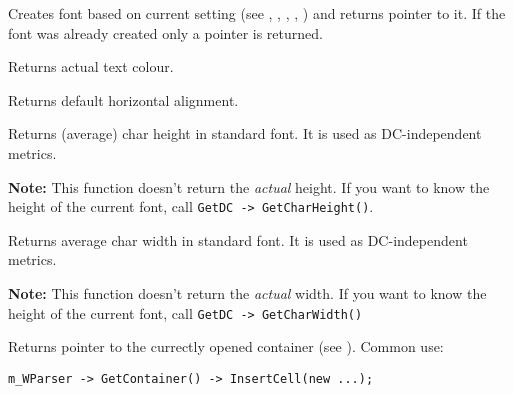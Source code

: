 
Creates font based on current setting (see 
, 
, 
, 
, 
)
and returns pointer to it.
If the font was already created only a pointer is returned.


\label{wxhtmlwinparsergetactualcolor}


Returns actual text colour.

\label{wxhtmlwinparsergetalign}


Returns default horizontal alignment.

\label{wxhtmlwinparsergetcharheight}


Returns (average) char height in standard font. It is used as DC-independent metrics.

{\bf Note:} This function doesn't return the {\it actual} height. If you want to
know the height of the current font, call {\tt GetDC -> GetCharHeight()}.

\label{wxhtmlwinparsergetcharwidth}


Returns average char width in standard font. It is used as DC-independent metrics.

{\bf Note:} This function doesn't return the {\it actual} width. If you want to
know the height of the current font, call {\tt GetDC -> GetCharWidth()}

\label{wxhtmlwinparsergetcontainer}


Returns pointer to the currectly opened container (see ).
Common use:

\begin{verbatim}
m_WParser -> GetContainer() -> InsertCell(new ...);
\end{verbatim}

